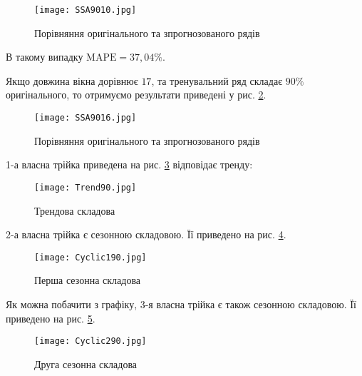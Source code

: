 \vspace{1em}

\begin{figure}[h]
  \texttt{[image: SSA9010.jpg]}
  \caption{Порівняння оригінального та зпрогнозованого рядів}
  \label{fig:SSA9010}
\end{figure}

В такому випадку $\text{MAPE} = 37,04\%$.

Якщо довжина вікна дорівнює $17$, та тренувальний ряд складає $90\%$ оригінального, то отримуємо результати приведені у рис. \ref{fig:SSA9016}.

\vspace{1em}

\begin{figure}[h]
  \texttt{[image: SSA9016.jpg]}
  \caption{Порівняння оригінального та зпрогнозованого рядів}
  \label{fig:SSA9016}
\end{figure}

1-а власна трійка приведена на рис. \ref{fig:Trend90} відповідає тренду:

\newpage

\vspace{1em}

\begin{figure}[h]
  \texttt{[image: Trend90.jpg]}
  \caption{Трендова складова}
  \label{fig:Trend90}
\end{figure}

2-а власна трійка є сезонною складовою. Її приведено на рис. \ref{fig:Cyclic190}.

\vspace{1em}

\begin{figure}[h]
  \texttt{[image: Cyclic190.jpg]}
  \caption{Перша сезонна складова}
  \label{fig:Cyclic190}
\end{figure}

Як можна побачити з графіку, 3-я власна трійка є також сезонною складовою. Її приведено на рис. \ref{fig:Cyclic290}.

\newpage

\vspace{1em}

\begin{figure}[h]
  \texttt{[image: Cyclic290.jpg]}
  \caption{Друга сезонна складова}
  \label{fig:Cyclic290}
\end{figure}


